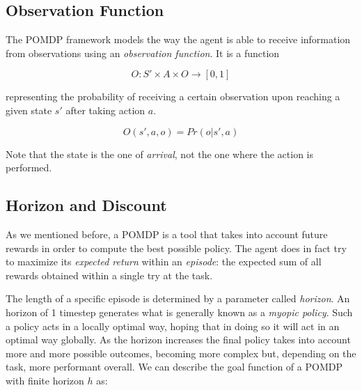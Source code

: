 
\subsection{Observation Function}

The POMDP framework models the way the agent is able to receive information from observations using
an \textit{observation function}. It is a function

\[ O : S' \times A \times O \rightarrow [0,1] \]

representing the probability of receiving a certain observation upon reaching a given state $s'$
after taking action $a$.

\[ O(s', a, o) = Pr(o | s', a) \]

Note that the state is the one of \textit{arrival}, not the one where the action is performed.

\subsection{Horizon and Discount}

As we mentioned before, a POMDP is a tool that takes into account future rewards in order to compute
the best possible policy. The agent does in fact try to maximize its \textit{expected return} within
an \textit{episode}: the expected sum of all rewards obtained within a single try at the task.

The length of a specific episode is determined by a parameter called \textit{horizon}. An horizon of
1 timestep generates what is generally known as a \textit{myopic policy}. Such a policy acts in a
locally optimal way, hoping that in doing so it will act in an optimal way globally. As the horizon
increases the final policy takes into account more and more possible outcomes, becoming more complex
but, depending on the task, more performant overall. We can describe the goal function of a POMDP
with finite horizon $h$ as:

